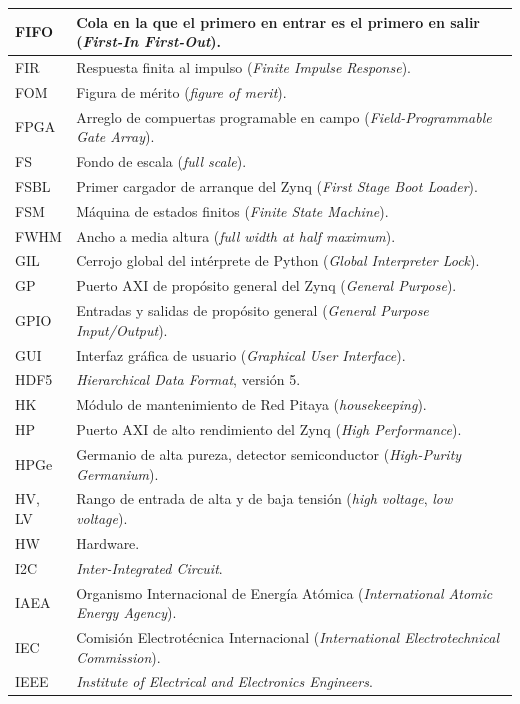{\begin{longtable}{|>{\raggedright\arraybackslash}p{}%
  |>{\raggedright\arraybackslash}p{}|}
FIFO & Cola en la que el primero en entrar es el primero en salir (\emph{First-In First-Out}). \\ \hline
FIR & Respuesta finita al impulso (\emph{Finite Impulse Response}). \\ \hline
FOM & Figura de mérito (\emph{figure of merit}). \\ \hline
FPGA & Arreglo de compuertas programable en campo (\emph{Field-Programmable Gate Array}). \\ \hline
FS & Fondo de escala (\emph{full scale}). \\ \hline
FSBL & Primer cargador de arranque del Zynq (\emph{First Stage Boot Loader}). \\ \hline
FSM & Máquina de estados finitos (\emph{Finite State Machine}). \\ \hline
FWHM & Ancho a media altura (\emph{full width at half maximum}). \\ \hline
GIL & Cerrojo global del intérprete de Python (\emph{Global Interpreter Lock}). \\ \hline
GP & Puerto AXI de propósito general del Zynq (\emph{General Purpose}). \\ \hline
GPIO & Entradas y salidas de propósito general (\emph{General Purpose Input/Output}). \\ \hline
GUI & Interfaz gráfica de usuario (\emph{Graphical User Interface}). \\ \hline
HDF5 & \emph{Hierarchical Data Format}, versión 5. \\ \hline
HK & Módulo de mantenimiento de Red Pitaya (\emph{housekeeping}). \\ \hline
HP & Puerto AXI de alto rendimiento del Zynq (\emph{High Performance}). \\ \hline
HPGe & Germanio de alta pureza, detector semiconductor (\emph{High-Purity Germanium}). \\ \hline
HV, LV & Rango de entrada de alta y de baja tensión (\emph{high voltage}, \emph{low voltage}). \\ \hline
HW & Hardware. \\ \hline
I2C & \emph{Inter-Integrated Circuit}. \\ \hline
IAEA & Organismo Internacional de Energía Atómica (\emph{International Atomic Energy Agency}). \\ \hline
IEC & Comisión Electrotécnica Internacional (\emph{International Electrotechnical Commission}). \\ \hline
IEEE & \emph{Institute of Electrical and Electronics Engineers}. \\ \hline

\end{longtable}}
